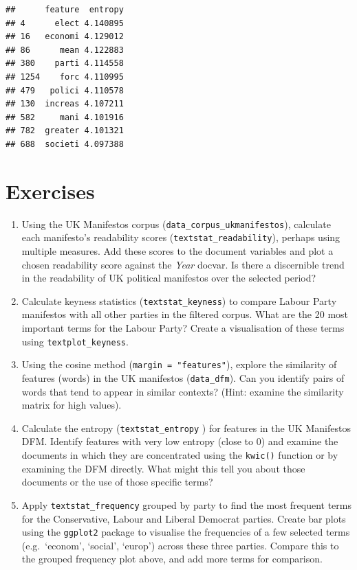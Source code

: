 \documentclass[
]{book}
\begin{document}
\begin{verbatim}
##      feature  entropy
## 4      elect 4.140895
## 16   economi 4.129012
## 86      mean 4.122883
## 380    parti 4.114558
## 1254    forc 4.110995
## 479   polici 4.110578
## 130  increas 4.107211
## 582     mani 4.101916
## 782  greater 4.101321
## 688  societi 4.097388
\end{verbatim}

\section{Exercises}\label{exercises}

\begin{enumerate}
\def\labelenumi{\arabic{enumi}.}
\item
  Using the UK Manifestos corpus (\texttt{data\_corpus\_ukmanifestos}), calculate each manifesto's readability scores (\texttt{textstat\_readability}), perhaps using multiple measures. Add these scores to the document variables and plot a chosen readability score against the \emph{Year} docvar. Is there a discernible trend in the readability of UK political manifestos over the selected period?
\item
  Calculate keyness statistics (\texttt{textstat\_keyness}) to compare Labour Party manifestos with all other parties in the filtered corpus. What are the 20 most important terms for the Labour Party? Create a visualisation of these terms using \texttt{textplot\_keyness}.
\item
  Using the cosine method (\texttt{margin\ =\ "features"}), explore the similarity of features (words) in the UK manifestos (\texttt{data\_dfm}). Can you identify pairs of words that tend to appear in similar contexts? (Hint: examine the similarity matrix for high values).
\item
  Calculate the entropy (\texttt{textstat\_entropy} ) for features in the UK Manifestos DFM. Identify features with very low entropy (close to 0) and examine the documents in which they are concentrated using the \texttt{kwic()} function or by examining the DFM directly. What might this tell you about those documents or the use of those specific terms?
\item
  Apply \texttt{textstat\_frequency} grouped by party to find the most frequent terms for the Conservative, Labour and Liberal Democrat parties. Create bar plots using the \texttt{ggplot2} package to visualise the frequencies of a few selected terms (e.g.~`econom', `social', `europ') across these three parties. Compare this to the grouped frequency plot above, and add more terms for comparison.
\end{enumerate}
\end{document}
